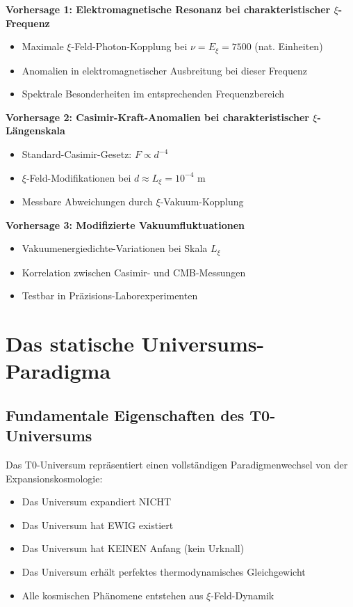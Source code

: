 	\textbf{Vorhersage 1: Elektromagnetische Resonanz bei charakteristischer $\xi$-Frequenz}
	\begin{itemize}
		\item Maximale $\xi$-Feld-Photon-Kopplung bei $\nu = E_\xi = 7500$ (nat. Einheiten)
		\item Anomalien in elektromagnetischer Ausbreitung bei dieser Frequenz
		\item Spektrale Besonderheiten im entsprechenden Frequenzbereich
	\end{itemize}
	
	\textbf{Vorhersage 2: Casimir-Kraft-Anomalien bei charakteristischer $\xi$-Längenskala}
	\begin{itemize}
		\item Standard-Casimir-Gesetz: $F \propto d^{-4}$
		\item $\xi$-Feld-Modifikationen bei $d \approx L_\xi = 10^{-4}$ m
		\item Messbare Abweichungen durch $\xi$-Vakuum-Kopplung
	\end{itemize}
	
	\textbf{Vorhersage 3: Modifizierte Vakuumfluktuationen}
	\begin{itemize}
		\item Vakuumenergiedichte-Variationen bei Skala $L_\xi$
		\item Korrelation zwischen Casimir- und CMB-Messungen
		\item Testbar in Präzisions-Laborexperimenten
	\end{itemize}
	
	\section{Das statische Universums-Paradigma}
	
	\subsection{Fundamentale Eigenschaften des T0-Universums}
	
	\begin{revolutionary}
		Das T0-Universum repräsentiert einen vollständigen Paradigmenwechsel von der Expansionskosmologie:
		\begin{itemize}
			\item Das Universum expandiert NICHT
			\item Das Universum hat EWIG existiert
			\item Das Universum hat KEINEN Anfang (kein Urknall)
			\item Das Universum erhält perfektes thermodynamisches Gleichgewicht
			\item Alle kosmischen Phänomene entstehen aus $\xi$-Feld-Dynamik
		\end{itemize}
	\end{revolutionary}
	
